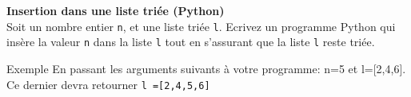 \begin{Exercice}[15 minutes] \textbf{Insertion dans une liste triée (Python)}\\
    Soit un nombre entier \lstinline{n}, et une liste triée \lstinline{l}. Ecrivez un programme Python qui insère la valeur \lstinline{n} dans la liste \lstinline{l} tout en s'assurant que la liste \lstinline{l} reste triée.

    

    \begin{Example}{\faTerminal \quad Exemple}
        En passant les arguments suivants à votre programme: n=5 et l=[2,4,6]. Ce dernier devra retourner \lstinline{l =[2,4,5,6]}
    \end{Example}

    \begin{solution}
        
    \end{solution}


\end{Exercice}

